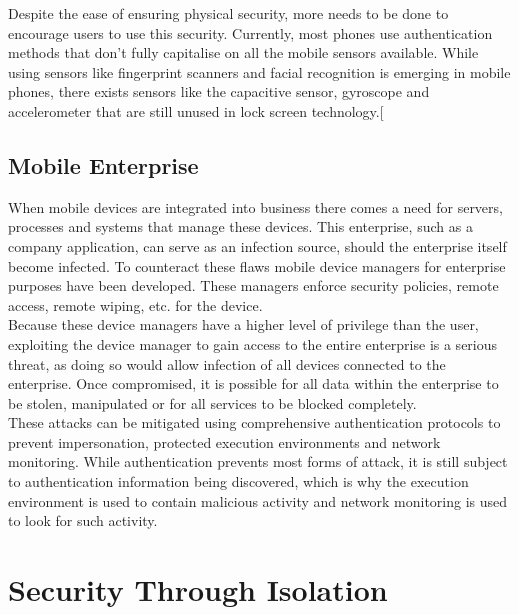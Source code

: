 Despite the ease of ensuring physical security, more needs to be done to encourage users to use this security.
Currently, most phones use authentication methods that don’t fully capitalise on all the mobile sensors available.
While using sensors like fingerprint scanners and facial recognition is emerging in mobile phones, there exists sensors like the capacitive sensor, gyroscope and accelerometer that are still unused in lock screen technology.[\cite{Reference13}


\subsection{Mobile Enterprise}

\label{Ch2 Sec2 Sub5}

When mobile devices are integrated into business there comes a need for servers, processes and systems that manage these devices.
This enterprise, such as a company application, can serve as an infection source, should the enterprise itself become infected.
To counteract these flaws mobile device managers for enterprise purposes have been developed.
These managers enforce security policies, remote access, remote wiping, etc. for the device.\\
Because these device managers have a higher level of privilege than the user, exploiting the device manager to gain access to the entire enterprise is a serious threat, as doing so would allow infection of all devices connected to the enterprise.
Once compromised, it is possible for all data within the enterprise to be stolen, manipulated or for all services to be blocked completely.\\
These attacks can be mitigated using comprehensive authentication protocols to prevent impersonation, protected execution environments and network monitoring.
While authentication prevents most forms of attack, it is still subject to authentication information being discovered, which is why the execution environment is used to contain malicious activity and network monitoring is used to look for such activity.\cite{Reference13}


\section{Security Through Isolation}


